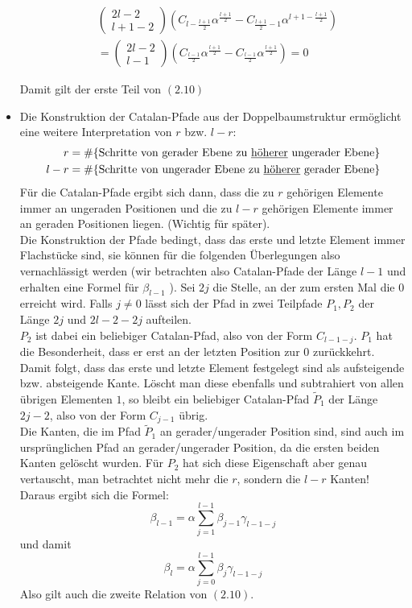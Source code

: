 \documentclass[a4paper, 11pt]{scrreprt}
\begin{document}
\begin{itemize}
\begin{align*}
 &\begin{pmatrix} 2l-2\\l+1-2\end{pmatrix} \left( C_{l-\frac{l+1}{2}} \alpha^{\frac{l+1}{2}} - C_{\frac{l+1}{2} -1}\alpha^{l+1-\frac{l+1}{2}} \right)\\
&=\begin{pmatrix} 2l-2\\l-1\end{pmatrix} \left( C_{\frac{l-1}{2}} \alpha^{\frac{l+1}{2}} - C_{\frac{l-1}{2}}\alpha^{\frac{l+1}{2}} \right)=0
\end{align*}

Damit gilt der erste Teil von \((2.10)\)\\
\item
Die Konstruktion der Catalan-Pfade aus der Doppelbaumstruktur ermöglicht eine weitere Interpretation von \(r\) bzw. \(l-r\):\\
\begin{align*}
	r&=\# \{\text{Schritte von gerader Ebene zu \underline{höherer} ungerader Ebene}\} \\
	l-r &= \#\{\text{Schritte von ungerader Ebene zu \underline{höherer} gerader Ebene}\}
\end{align*}
Für die Catalan-Pfade ergibt sich dann, dass die zu \(r\) gehörigen Elemente immer an ungeraden Positionen und die zu \(l-r\) gehörigen Elemente immer an geraden Positionen liegen. (Wichtig für später).\\
Die Konstruktion der Pfade bedingt, dass das erste und letzte Element immer Flachstücke sind, sie können für die folgenden Überlegungen also vernachlässigt werden (wir betrachten also Catalan-Pfade der Länge \(l-1\) und erhalten eine Formel für \(\beta_{l-1}\) ). Sei \(2j\) die Stelle, an der zum ersten Mal die \(0\) erreicht wird. Falls \(j\not=0\) lässt sich der Pfad in zwei Teilpfade \(P_1, P_2\) der Länge \(2j\) und \(2l-2-2j\) aufteilen.\\
\(P_2\) ist dabei ein beliebiger Catalan-Pfad, also von der Form \(C_{l-1-j}\). \(P_1\) hat die Besonderheit, dass er erst an der letzten Position zur \(0\) zurückkehrt. Damit folgt, dass das erste und letzte Element festgelegt sind als aufsteigende bzw. absteigende Kante. Löscht man diese ebenfalls und subtrahiert von allen übrigen Elementen \(1\), so bleibt ein beliebiger Catalan-Pfad \(\tilde{P}_1\) der Länge \(2j-2\), also von der Form \(C_{j-1}\) übrig. \\
Die Kanten, die im Pfad \(\tilde{P}_1\) an gerader/ungerader Position sind, sind auch im ursprünglichen Pfad an gerader/ungerader Position, da die ersten beiden Kanten gelöscht wurden. Für \(P_2\) hat sich diese Eigenschaft aber genau vertauscht, man betrachtet nicht mehr die \(r\), sondern die \(l-r\) Kanten!\\
Daraus ergibt sich die Formel:
	\[\beta_{l-1}=\alpha \sum_{j=1}^{l-1}\beta_{j-1}\gamma_{l-1-j}\]
und damit
\begin{equation}
	\beta_l=\alpha \sum_{j=0}^{l-1}\beta_j\gamma_{l-1-j}
\end{equation}
Also gilt auch die zweite Relation von \((2.10)\).\\
\end{itemize}
\end{document}
